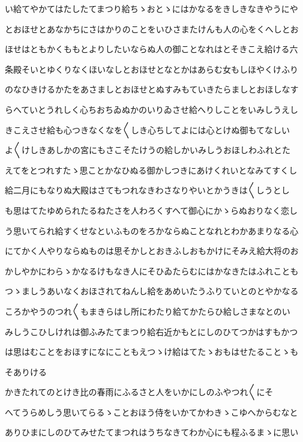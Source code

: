 \documentclass[a4paper,11pt,landscape]{ltjtarticle}
\begin{document}
\par\medskip
い給てやかてはたしたてまつり給ちゝおとゝにはかなるをきしきなきやうにや
\par\medskip
とおほせとあなかちにさはかりのことをいひさまたけんも人の心をくへしとお
\par\medskip
ほせはともかくももとよりしたいならぬ人の御ことなれはとそきこえ給ける六
\par\medskip
条殿そいとゆくりなくほいなしとおほせとなとかはあらむ女もしほやくけふり
\par\medskip
のなひきけるかたをあさましとおほせとぬすみもていきたらましとおほしなす
\par\medskip
らへていとうれしく心ちおちゐぬかのいりゐさせ給へりしことをいみしうえし
\par\medskip
きこえさせ給も心つきなくなを〱しき心ちしてよには心とけぬ御もてなしい
\par\medskip
よ〱けしきあしかの宮にもさこそたけうの給しかいみしうおほしわふれとた
\par\medskip
えてをとつれすたゝ思ことかなひぬる御かしつきにあけくれいとなみてすくし
\par\medskip
給二月にもなりぬ大殿はさてもつれなきわさなりやいとかうきは〱しうとし
\par\medskip
も思はてたゆめられたるねたさを人わろくすへて御心にかゝらぬおりなく恋し
\par\medskip
う思いてられ給すくせなといふものをろかならぬことなれとわかあまりなる心
\par\medskip
にてかく人やりならぬものは思そかしとおきふしおもかけにそみえ給大将のお
\par\medskip
かしやかにわらゝかなるけもなき人にそひゐたらむにはかなきたはふれことも
\par\medskip
つゝましうあいなくおほされてねんし給をあめいたうふりていとのとやかなる
\par\medskip
ころかやうのつれ〱もまきらはし所にわたり給てかたらひ給しさまなとのい
\par\medskip
みしうこひしけれは御ふみたてまつり給右近かもとにしのひてつかはすもかつ
\par\medskip
は思はむことをおほすになにこともえつゝけ給はてたゝおもはせたることゝも
\par\medskip
そありける
\par\medskip
かきたれてのとけき比の春雨にふるさと人をいかにしのふやつれ〱にそ
\par\medskip
へてうらめしう思いてらるゝことおほう侍をいかてかわきゝこゆへからむなと
\par\medskip
ありひまにしのひてみせたてまつれはうちなきてわか心にも程ふるまゝに思い
\end{document}
